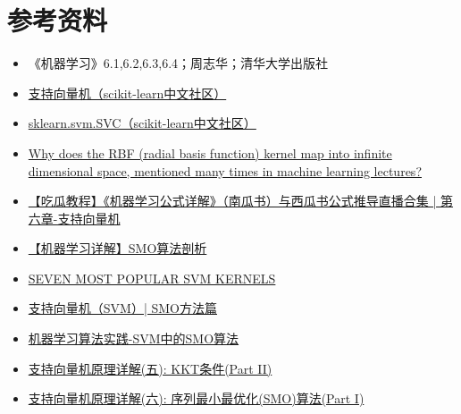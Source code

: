 \documentclass{ctexart}
\begin{document}
	\section{参考资料}
	\begin{itemize}
		\item 《机器学习》6.1,6.2,6.3,6.4；周志华；清华大学出版社
		\item \href{https://scikit-learn.org.cn/view/83.html}{支持向量机（scikit-learn中文社区）}
		\item \href{https://scikit-learn.org.cn/view/781.html}{sklearn.svm.SVC（scikit-learn中文社区）}
		\item \href{https://www.quora.com/Why-does-the-RBF-radial-basis-function-kernel-map-into-infinite-dimensional-space-mentioned-many-times-in-machine-learning-lectures/answer/Arun-Iyer-1}{Why does the RBF (radial basis function) kernel map into infinite dimensional space, mentioned many times in machine learning lectures?}
		\item \href{https://www.bilibili.com/video/BV1Mh411e7VU?p=8}{【吃瓜教程】《机器学习公式详解》（南瓜书）与西瓜书公式推导直播合集 | 第六章-支持向量机}
		\item \href{https://blog.csdn.net/luoshixian099/article/details/51227754}{【机器学习详解】SMO算法剖析}
		\item \href{https://dataaspirant.com/svm-kernels/}{SEVEN MOST POPULAR SVM KERNELS}
		\item \href{https://zhuanlan.zhihu.com/p/53759576}{支持向量机（SVM）| SMO方法篇}
		\item \href{https://zhuanlan.zhihu.com/p/29212107}{机器学习算法实践-SVM中的SMO算法}
		\item \href{https://zhuanlan.zhihu.com/p/65453337}{支持向量机原理详解(五): KKT条件(Part II)}
		\item \href{https://zhuanlan.zhihu.com/p/64580199}{支持向量机原理详解(六): 序列最小最优化(SMO)算法(Part I)}
	\end{itemize}
\end{document}
